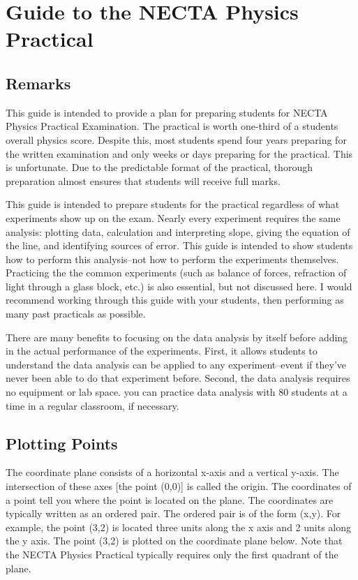 
\section{Guide to the NECTA Physics Practical}

\subsection{Remarks}
This guide is intended to provide a plan for preparing students for NECTA Physics Practical Examination. The practical is worth one-third of a students overall physics score. Despite this, most students spend four years preparing for the written examination and only weeks or days preparing for the practical. This is unfortunate. Due to the predictable format of the practical, thorough preparation almost ensures that students will receive full marks. 

This guide is intended to prepare students for the practical regardless of what experiments show up on the exam. Nearly every experiment requires the same analysis: plotting data, calculation and interpreting slope, giving the equation of the line, and identifying sources of error. This guide is intended to show students how to perform this analysis--not how to perform the experiments themselves. Practicing the the common experiments (such as balance of forces, refraction of light through a glass block, etc.) is also essential, but not discussed here. I would recommend working through this guide with your students, then performing as many past practicals as possible. 

There are many benefits to focusing on the data analysis by itself before adding in the actual performance of the experiments. First, it allows students to understand the data analysis can be applied to any experiment--event if they've never been able to do that experiment before. Second, the data analysis requires no equipment or lab space. you can practice data analysis with 80 students at a time in a regular classroom, if necessary. 

\subsection{Plotting Points}
The coordinate plane consists of a horizontal x-axis and a vertical y-axis. The intersection of these axes [the point (0,0)] is called the origin. The coordinates of a point tell you where the point is located on the plane. The coordinates are typically written as an ordered pair. The ordered pair is of the form (x,y). For example, the point (3,2) is located three units along the x axis and 2 units along the y axis. The point (3,2) is plotted on the coordinate plane below. Note that the NECTA Physics Practical typically requires only the first quadrant of the plane.

